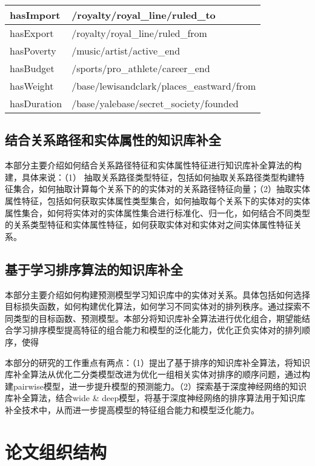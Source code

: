 \begin{table}[htbp]
\begin{tabular}{|l|l|}
    hasImport  & /royalty/royal\_line/ruled\_to \\
    \hline
    hasExport  & /royalty/royal\_line/ruled\_from \\
    \hline
    hasPoverty  & /music/artist/active\_end \\
    \hline
    hasBudget  & /sports/pro\_athlete/career\_end \\
    \hline
    hasWeight  & /base/lewisandclark/places\_eastward/from \\
    \hline
    hasDuration  & /base/yalebase/secret\_society/founded \\
    \hline
    \end{tabular}%
  \label{tab:addlabel-attr}%
\end{table}%

\subsection{结合关系路径和实体属性的知识库补全}
本部分主要介绍如何结合关系路径特征和实体属性特征进行知识库补全算法的构建，具体来说：（1）
抽取关系路径类型特征，包括如何抽取关系路径类型构建特征集合，如何抽取计算每个关系下的的实体对的关系路径特征向量；（2）抽取实体属性特征，包括如何获取实体属性类型集合，如何抽取每个关系下的实体对的实体属性集合，如何将实体对的实体属性集合进行标准化、归一化，如何结合不同类型的关系类型特征和实体属性特征，如何获取实体对和实体对之间实体属性特征关系。

\subsection{基于学习排序算法的知识库补全}
本部分主要介绍如何构建预测模型学习知识库中的实体对关系。具体包括如何选择目标损失函数，如何构建优化算法，如何学习不同实体对的排列秩序。通过探索不同类型的目标函数、预测模型。本部分将知识库补全算法进行优化组合，期望能结合学习排序模型提高特征的组合能力和模型的泛化能力，优化正负实体对的排列顺序，使得 

本部分的研究的工作重点有两点：（1）提出了基于排序的知识库补全算法，将知识库补全算法从优化二分类模型改进为优化一组相关实体对排序的顺序问题，通过构建pairwise模型，进一步提升模型的预测能力。（2）探索基于深度神经网络的知识库补全算法，结合wide \& deep模型，将基于深度神经网络的排序算法用于知识库补全技术中，从而进一步提高模型的特征组合能力和模型泛化能力。

\section{论文组织结构}

